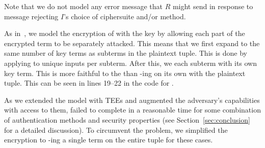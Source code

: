 Note that we do not model any error message that $R$ might send in response
to message \mMsgone rejecting $I$'s choice of ciphersuite and/or method.
%

As in~\cite{Norr21}, we model the \mXor{} encryption of 
 with
the key  by allowing each part of the encrypted term to be
separately attacked.
%
This means that we first expand  to the same number of key terms 
as
subterms in the plaintext tuple.
%
This is done by applying \mHkdfExpand{} to unique inputs per subterm.
%
After this, we \mXor{} each subterm with its own key term.
%
This is more faithful to the \mSpec{} than \mXor-ing  on its own
with the plaintext tuple.
%
This can be seen in lines 19--22 in the code for .
%

As we extended the model with TEEs and augmented the adversary's 
capabilities
with access to them, \mTamarin{} failed to complete in a reasonable time for
some combination of authentication methods and security properties (see 
Section~\ref{sec:conclusion} for a detailed discussion).
%
To circumvent the problem, we simplified the \mXor{} encryption to 
\mXor-ing 
a
single term on the entire tuple for these cases. \\
%

